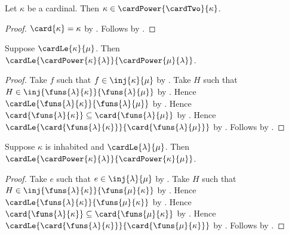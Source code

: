 \begin{corollary}\label{cantor_cardinal_power_for_cardinal}
    Let $\kappa$ be a cardinal.
    Then $\kappa\in\cardPower{\cardTwo}{\kappa}$.
\end{corollary}
\begin{proof}
    $\card{\kappa}=\kappa$ by .
    Follows by .
\end{proof}

\begin{theorem}\label{cardinal_power_monotone_base}
    Suppose $\cardLe{\kappa}{\mu}$.
    Then $\cardLe{\cardPower{\kappa}{\lambda}}
        {\cardPower{\mu}{\lambda}}$.
\end{theorem}
\begin{proof}
    Take $f$ such that $f\in\inj{\kappa}{\mu}$
        by .
    Take $H$ such that
        $H\in\inj{\funs{\lambda}{\kappa}}{\funs{\lambda}{\mu}}$
        by .
    Hence $\cardLe{\funs{\lambda}{\kappa}}{\funs{\lambda}{\mu}}$
        by .
    Hence $\card{\funs{\lambda}{\kappa}}
        \subseteq\card{\funs{\lambda}{\mu}}$
        by .
    Hence $\cardLe{\card{\funs{\lambda}{\kappa}}}
        {\card{\funs{\lambda}{\mu}}}$
        by .
    Follows by .
\end{proof}

\begin{theorem}\label{cardinal_power_monotone_exponent}
    Suppose $\kappa$ is inhabited and $\cardLe{\lambda}{\mu}$.
    Then $\cardLe{\cardPower{\kappa}{\lambda}}
        {\cardPower{\kappa}{\mu}}$.
\end{theorem}
\begin{proof}
    Take $e$ such that $e\in\inj{\lambda}{\mu}$
        by .
    Take $H$ such that
        $H\in\inj{\funs{\lambda}{\kappa}}{\funs{\mu}{\kappa}}$
        by .
    Hence $\cardLe{\funs{\lambda}{\kappa}}{\funs{\mu}{\kappa}}$
        by .
    Hence $\card{\funs{\lambda}{\kappa}}
        \subseteq\card{\funs{\mu}{\kappa}}$
        by .
    Hence $\cardLe{\card{\funs{\lambda}{\kappa}}}
        {\card{\funs{\mu}{\kappa}}}$
        by .
    Follows by .
\end{proof}

